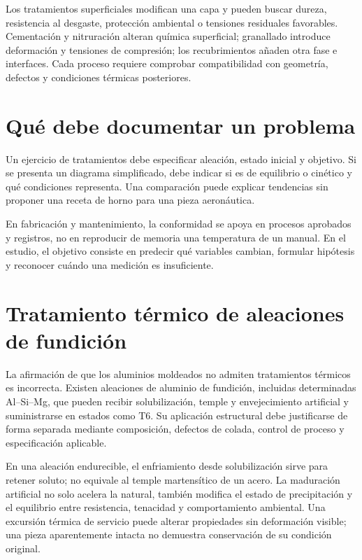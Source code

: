 Los tratamientos superficiales modifican una capa y pueden buscar dureza, resistencia al desgaste, protección ambiental o tensiones residuales favorables. Cementación y nitruración alteran química superficial; granallado introduce deformación y tensiones de compresión; los recubrimientos añaden otra fase e interfaces. Cada proceso requiere comprobar compatibilidad con geometría, defectos y condiciones térmicas posteriores.
\section{Qué debe documentar un problema}
Un ejercicio de tratamientos debe especificar aleación, estado inicial y objetivo. Si se presenta un diagrama simplificado, debe indicar si es de equilibrio o cinético y qué condiciones representa. Una comparación puede explicar tendencias sin proponer una receta de horno para una pieza aeronáutica.

En fabricación y mantenimiento, la conformidad se apoya en procesos aprobados y registros, no en reproducir de memoria una temperatura de un manual. En el estudio, el objetivo consiste en predecir qué variables cambian, formular hipótesis y reconocer cuándo una medición es insuficiente.
\section{Tratamiento térmico de aleaciones de fundición}
La afirmación de que los aluminios moldeados no admiten tratamientos térmicos es incorrecta. Existen aleaciones de aluminio de fundición, incluidas determinadas Al--Si--Mg, que pueden recibir solubilización, temple y envejecimiento artificial y suministrarse en estados como T6. Su aplicación estructural debe justificarse de forma separada mediante composición, defectos de colada, control de proceso y especificación aplicable.

En una aleación endurecible, el enfriamiento desde solubilización sirve para retener soluto; no equivale al temple martensítico de un acero. La maduración artificial no solo acelera la natural, también modifica el estado de precipitación y el equilibrio entre resistencia, tenacidad y comportamiento ambiental. Una excursión térmica de servicio puede alterar propiedades sin deformación visible; una pieza aparentemente intacta no demuestra conservación de su condición original.

